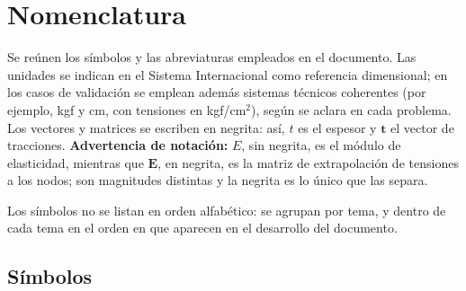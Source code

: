 
\chapter*{Nomenclatura}

Se reúnen los símbolos y las abreviaturas empleados en el documento. Las
unidades se indican en el Sistema Internacional como referencia dimensional;
en los casos de validación se emplean además sistemas técnicos coherentes
(por ejemplo, kgf y cm, con tensiones en kgf/cm$^2$), según se aclara en cada problema.
Los vectores y matrices se escriben en negrita: así, $t$ es el espesor y $\bm{t}$ el
vector de tracciones. \textbf{Advertencia de notación:} $E$, sin negrita, es el módulo
de elasticidad, mientras que $\bm{E}$, en negrita, es la matriz de extrapolación de
tensiones a los nodos; son magnitudes distintas y la negrita es lo único que las separa.

Los símbolos no se listan en orden alfabético: se agrupan por tema, y dentro de cada
tema en el orden en que aparecen en el desarrollo del documento.

\section*{Símbolos}

